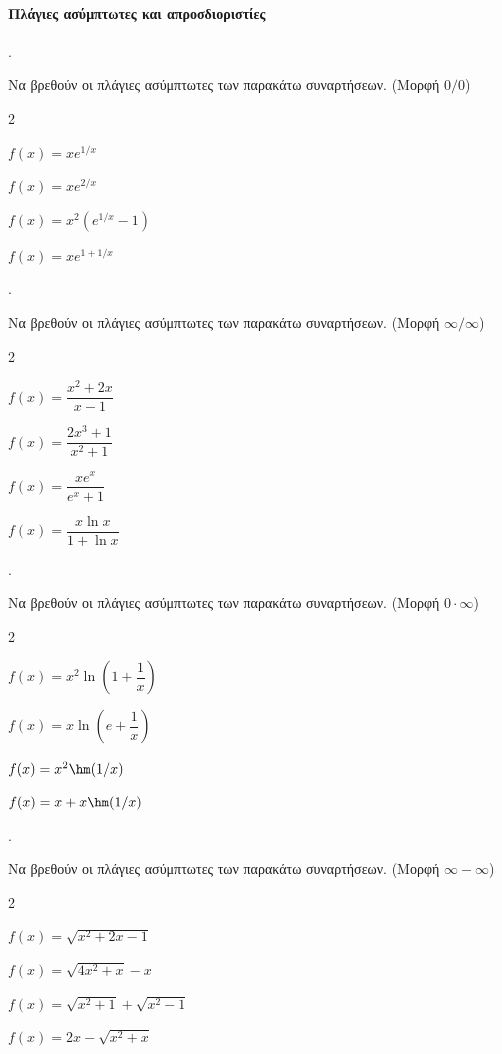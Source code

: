 \documentclass[11pt,a4paper,twocolumn]{article}
\newcounter{askhsh}
\newcommand{\askhsh}{\large\theaskhsh.\ \addtocounter{askhsh}{1}}
\begin{document}
\paragraph{Πλάγιες ασύμπτωτες και απροσδιοριστίες}
\askhsh Να βρεθούν οι πλάγιες ασύμπτωτες των παρακάτω συναρτήσεων. (Μορφή $0/0$)
\begin{multicols}{2}
\begin{alist}
\item $f(x)=xe^{1/x}$
\item $f(x)=xe^{2/x}$
\item $f(x)=x^2\left(e^{1/x}-1\right)$
\item $f(x)=xe^{1+1/x}$
\end{alist}
\end{multicols}
\askhsh Να βρεθούν οι πλάγιες ασύμπτωτες των παρακάτω συναρτήσεων. (Μορφή $\infty/\infty$)
\begin{multicols}{2}
\begin{alist}
\item $f(x)=\dfrac{x^2+2x}{x-1}$
\item $f(x)=\dfrac{2x^3+1}{x^2+1}$
\item $f(x)=\dfrac{xe^x}{e^x+1}$
\item $f(x)=\dfrac{x\ln x}{1+\ln x}$
\end{alist}
\end{multicols}
\askhsh Να βρεθούν οι πλάγιες ασύμπτωτες των παρακάτω συναρτήσεων. (Μορφή $0\cdot\infty$)
\begin{multicols}{2}
\begin{alist}
\item $f(x)=x^2\ln\left(1+\dfrac{1}{x}\right)$
\item $f(x)=x\ln\left(e+\dfrac{1}{x}\right)$
\item $f(x)=x^2\hm(1/x)$
\item $f(x)=x+x\hm(1/x)$
\end{alist}
\end{multicols}
\askhsh Να βρεθούν οι πλάγιες ασύμπτωτες των παρακάτω συναρτήσεων. (Μορφή $\infty-\infty$)
\begin{multicols}{2}
\begin{alist}
\item $f(x)=\sqrt{x^2+2x-1}$
\item $f(x)=\sqrt{4x^2+x}-x$
\item $f(x)=\sqrt{x^2+1}+\sqrt{x^2-1}$
\item $f(x)=2x-\sqrt{x^2+x}$
\end{alist}
\end{multicols}
\end{document}
